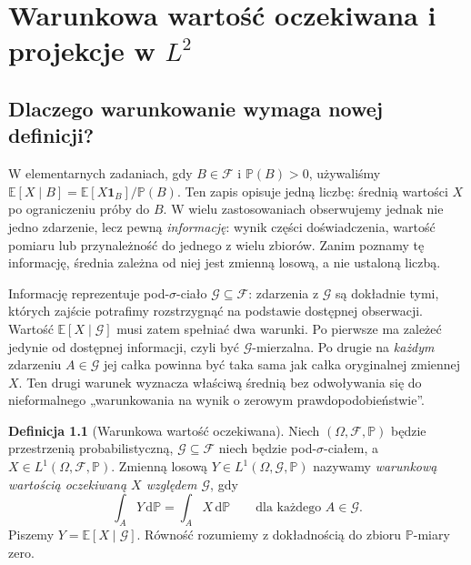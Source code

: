 \documentclass[11pt,a4paper,oneside]{report}
\numberwithin{equation}{chapter}
\theoremstyle{plain}
\theoremstyle{definition}
\newtheorem{definicja}{Definicja}[chapter]
\theoremstyle{remark}
\newcommand{\Prob}{\mathbb{P}}
\newcommand{\E}{\mathbb{E}}
\newcommand{\ind}[1]{\mathbf{1}_{#1}}
\newcommand{\dd}{\mathrm{d}}
\begin{document}
\chapter{Warunkowa wartość oczekiwana i projekcje w \texorpdfstring{$L^2$}{L2}}
\label{ch:condexp}

\section{Dlaczego warunkowanie wymaga nowej definicji?}

W elementarnych zadaniach, gdy $B\in\mathcal F$ i
$\Prob(B)>0$, używaliśmy
$\E[X\mid B]=\E[X\ind B]/\Prob(B)$.
Ten zapis opisuje jedną liczbę: średnią wartości $X$
po ograniczeniu próby do $B$. W wielu zastosowaniach
obserwujemy jednak nie jedno zdarzenie, lecz pewną
\emph{informację}: wynik części doświadczenia, wartość
pomiaru lub przynależność do jednego z wielu zbiorów.
Zanim poznamy tę informację, średnia zależna od niej
jest zmienną losową, a nie ustaloną liczbą.

Informację reprezentuje pod-$\sigma$-ciało
$\mathcal G\subseteq\mathcal F$: zdarzenia z
$\mathcal G$ są dokładnie tymi, których zajście
potrafimy rozstrzygnąć na podstawie dostępnej obserwacji.
Wartość $\E[X\mid\mathcal G]$ musi zatem
spełniać dwa warunki. Po pierwsze ma zależeć jedynie
od dostępnej informacji, czyli być
$\mathcal G$-mierzalna. Po drugie na \emph{każdym}
zdarzeniu $A\in\mathcal G$ jej całka powinna być
taka sama jak całka oryginalnej zmiennej $X$.
Ten drugi warunek wyznacza właściwą średnią bez
odwoływania się do nieformalnego „warunkowania
na wynik o zerowym prawdopodobieństwie”.

\begin{definicja}[Warunkowa wartość oczekiwana]
Niech $(\Omega,\mathcal F,\Prob)$ będzie przestrzenią
probabilistyczną, $\mathcal G\subseteq\mathcal F$
niech będzie pod-$\sigma$-ciałem, a $X\in L^1(\Omega,
\mathcal F,\Prob)$. Zmienną losową
$Y\in L^1(\Omega,\mathcal G,\Prob)$ nazywamy
\emph{warunkową wartością oczekiwaną $X$ względem
$\mathcal G$}, gdy
\[
\int_A Y\,\dd\Prob=\int_A X\,\dd\Prob
\qquad\text{dla każdego }A\in\mathcal G.
\]
Piszemy $Y=\E[X\mid\mathcal G]$.
Równość rozumiemy z dokładnością do zbioru
$\Prob$-miary zero.
\end{definicja}
\end{document}
